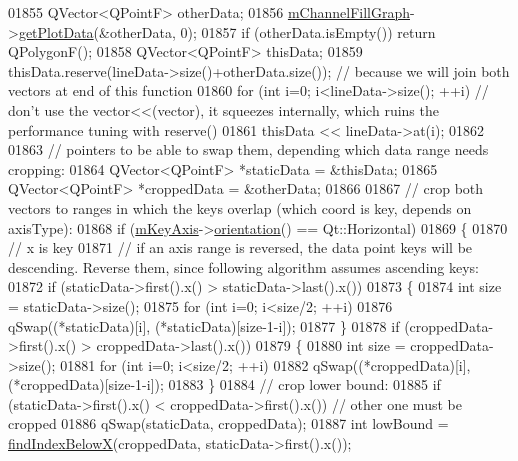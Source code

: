 \begin{DoxyCode}
01855   QVector<QPointF> otherData;
01856   \hyperlink{a00031_aa49af2f241d9ffdc301a24f08b10bdc8}{mChannelFillGraph}->\hyperlink{a00031_af66183533a29520be3e74489ad1449cc}{getPlotData}(&otherData, 0);
01857   \textcolor{keywordflow}{if} (otherData.isEmpty()) \textcolor{keywordflow}{return} QPolygonF();
01858   QVector<QPointF> thisData;
01859   thisData.reserve(lineData->size()+otherData.size()); \textcolor{comment}{// because we will join both vectors at end of this
       function}
01860   \textcolor{keywordflow}{for} (\textcolor{keywordtype}{int} i=0; i<lineData->size(); ++i) \textcolor{comment}{// don't use the vector<<(vector),  it squeezes internally, which
       ruins the performance tuning with reserve()}
01861     thisData << lineData->at(i);
01862   
01863   \textcolor{comment}{// pointers to be able to swap them, depending which data range needs cropping:}
01864   QVector<QPointF> *staticData = &thisData;
01865   QVector<QPointF> *croppedData = &otherData;
01866   
01867   \textcolor{comment}{// crop both vectors to ranges in which the keys overlap (which coord is key, depends on axisType):}
01868   \textcolor{keywordflow}{if} (\hyperlink{a00024_a692421b963472fa6e16156a74ba96832}{mKeyAxis}->\hyperlink{a00025_a57483f2f60145ddc9e63f3af53959265}{orientation}() == Qt::Horizontal)
01869   \{
01870     \textcolor{comment}{// x is key}
01871     \textcolor{comment}{// if an axis range is reversed, the data point keys will be descending. Reverse them, since following
       algorithm assumes ascending keys:}
01872     \textcolor{keywordflow}{if} (staticData->first().x() > staticData->last().x())
01873     \{
01874       \textcolor{keywordtype}{int} size = staticData->size();
01875       \textcolor{keywordflow}{for} (\textcolor{keywordtype}{int} i=0; i<size/2; ++i)
01876         qSwap((*staticData)[i], (*staticData)[size-1-i]);
01877     \}
01878     \textcolor{keywordflow}{if} (croppedData->first().x() > croppedData->last().x())
01879     \{
01880       \textcolor{keywordtype}{int} size = croppedData->size();
01881       \textcolor{keywordflow}{for} (\textcolor{keywordtype}{int} i=0; i<size/2; ++i)
01882         qSwap((*croppedData)[i], (*croppedData)[size-1-i]);
01883     \}
01884     \textcolor{comment}{// crop lower bound:}
01885     \textcolor{keywordflow}{if} (staticData->first().x() < croppedData->first().x()) \textcolor{comment}{// other one must be cropped}
01886       qSwap(staticData, croppedData);
01887     \textcolor{keywordtype}{int} lowBound = \hyperlink{a00031_a6f4e9461d5925be9228fc4760249a04f}{findIndexBelowX}(croppedData, staticData->first().x());

\end{DoxyCode}
